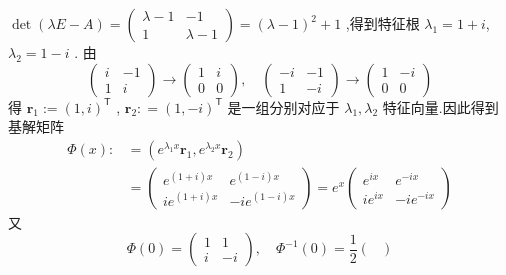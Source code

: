 \documentclass[lang=cn,12pt,color=green,fontset=none]{elegantbook}
\begin{document}
 \begin{solution}
    $ \det \left(  \lambda E-A \right) = \begin{pmatrix} 
         \lambda -1& -1\\ 
          1&  \lambda -1 
    \end{pmatrix}  =   \left(  \lambda -1 \right)^{2}+ 1  $  ,得到特征根 $  \lambda _{1} = 1+ i $, $  \lambda _{2}= 1-i $  .
    由 $$
    \begin{pmatrix} 
        i& -1\\ 
         1 & i 
    \end{pmatrix} \to  
        \begin{pmatrix} 
            1 & i\\ 
             0 & 0 
        \end{pmatrix} ,\quad  \begin{pmatrix} 
            -i & -1\\ 
             1 & -i
        \end{pmatrix}   \to  \begin{pmatrix} 
            1&-i\\ 
             0&0 
        \end{pmatrix} 
    $$得 $ \mathbf{r}_{1}:= \left( 1,i\right)^{\mathsf{T}}  $ , $ \mathbf{r}_{2} : = \left( 1,-i \right) ^{\mathsf{T}} $ 是一组分别对应于 $  \lambda _{1}, \lambda _{2} $ 特征向量.因此得到基解矩阵 $$
    \begin{aligned}
        \Phi \left( x \right) :&  = \left( e^{ \lambda _{1}x }\mathbf{r}_{1} ,e^{ \lambda _{2}x  } \mathbf{r}_{2}\right)   \\ 
          & = \begin{pmatrix} 
                e^{\left( 1+ i \right)x }& e^{\left( 1-i \right)x }\\ 
                 i e^{\left( 1+ i \right)x }& -i e^{\left( 1-i \right)x }
          \end{pmatrix} =e^{x} \begin{pmatrix} 
              e^{ix}& e^{-ix}\\ 
             ie^{ix}& -ie^{-ix} 
          \end{pmatrix} 
    \end{aligned}
    $$又 $$
    \Phi \left( 0 \right) = \begin{pmatrix} 
        1 & 1\\ 
         i & -i 
    \end{pmatrix}  ,\quad  \Phi ^{-1} \left( 0 \right) = \frac{1}{2} \begin{pmatrix} 

\end{pmatrix}$$
\end{solution}
\end{document}
